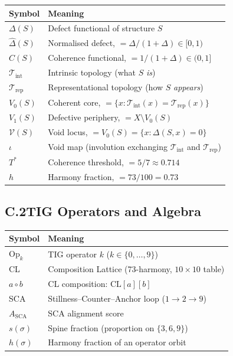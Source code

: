 \documentclass[12pt, openany]{book}
\theoremstyle{remark}
\newcommand{\Tint}{\mathcal{T}_{\mathrm{int}}}
\newcommand{\Trep}{\mathcal{T}_{\mathrm{rep}}}
\begin{document}
\begin{center}
\begin{tabular}{lp{10cm}}
\toprule
\textbf{Symbol} & \textbf{Meaning} \\
\midrule
$\Delta(S)$ & Defect functional of structure $S$ \\
$\hat{\Delta}(S)$ & Normalised defect, $= \Delta / (1 + \Delta) \in [0, 1)$ \\
$C(S)$ & Coherence functional, $= 1/(1 + \Delta) \in (0, 1]$ \\
$\Tint$ & Intrinsic topology (what $S$ \emph{is}) \\
$\Trep$ & Representational topology (how $S$ \emph{appears}) \\
$V_0(S)$ & Coherent core, $= \{x : \Tint(x) = \Trep(x)\}$ \\
$V_1(S)$ & Defective periphery, $= X \setminus V_0(S)$ \\
$\mathcal{V}(S)$ & Void locus, $= V_0(S) = \{x : \Delta(S, x) = 0\}$ \\
$\iota$ & Void map (involution exchanging $\Tint$ and $\Trep$) \\
$T^*$ & Coherence threshold, $= 5/7 \approx 0.714$ \\
$h$ & Harmony fraction, $= 73/100 = 0.73$ \\
\bottomrule
\end{tabular}
\end{center}

\subsection*{C.2\quad TIG Operators and Algebra}

\begin{center}
\begin{tabular}{lp{10cm}}
\toprule
\textbf{Symbol} & \textbf{Meaning} \\
\midrule
$\mathrm{Op}_k$ & TIG operator $k$ ($k \in \{0, \ldots, 9\}$) \\
CL & Composition Lattice (73-harmony, $10 \times 10$ table) \\
$a \circ b$ & CL composition: $\mathrm{CL}[a][b]$ \\
SCA & Stillness--Counter--Anchor loop ($1 \to 2 \to 9$) \\
$A_{\mathrm{SCA}}$ & SCA alignment score \\
$s(\sigma)$ & Spine fraction (proportion on $\{3, 6, 9\}$) \\
$h(\sigma)$ & Harmony fraction of an operator orbit \\
\bottomrule
\end{tabular}
\end{center}
\end{document}

